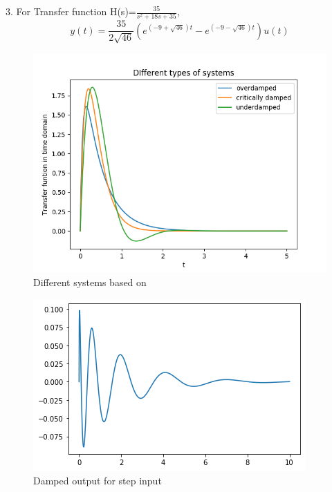 \begin{enumerate}[label=\thesection.\arabic*.,ref=\thesection.\theenumi]
3. For Transfer function H(s)=$\frac{35}{s^2+18s+35}$,\\
\begin{equation}
    y(t)=\frac{35}{2\sqrt{46}}(e^{(-9+\sqrt{46})t}-e^{(-9-\sqrt{46})t})u(t)
\end{equation}

\begin{figure}
    \centering
    \includegraphics[width=0.7\linewidth]{Damping.png}
    \caption{Different systems based on \zeta}
    \label{fig:Graph}
\end{figure}

\begin{figure}
    \centering
    \includegraphics[width=0.7\linewidth]{unitstepdamping.png}
    \caption{Damped output for step input}
    \label{fig:Graph}
\end{figure}
\end{enumerate}

